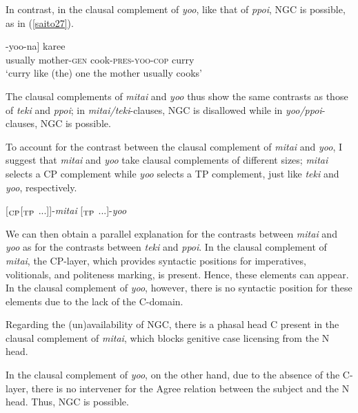\documentclass[output=paper]{langscibook}
\begin{document}
In contrast, in the clausal complement of \emph{yoo}, like that of \emph{ppoi}, NGC is possible, as in (\ref{saito27}).

\begin{exe}
\ex \label{saito27}
\gll [[{hudan} {okaasan-no} {tuku-ru}]-{yoo-na}] {karee}\\
usually mother-\textsc{gen} cook-\textsc{pres-yoo-cop} curry\\ 
\glt ‘curry like (the) one the mother usually cooks’
\end{exe}

The clausal complements of \emph{mitai} and \emph{yoo} thus show the same contrasts as those of \emph{teki} and \emph{ppoi}; in \emph{mitai/teki}-clauses, NGC is disallowed while in \emph{yoo/ppoi}-clauses, NGC is possible.

To account for the contrast between the clausal complement of \emph{mitai} and \emph{yoo}, I suggest that \emph{mitai} and \emph{yoo} take clausal complements of different sizes; \emph{mitai} selects a CP complement while \emph{yoo} selects a TP complement, just like \emph{teki} and \emph{yoo}, respectively.

\begin{exe}
\ex \label{saito28}
\begin{xlist}
\ex \label{saito28a}
[$_{\textnormal{CP}}$[$_{\textnormal{TP}}$ ...]]-\emph{mitai}
\ex \label{saito28b} [$_{\textnormal{TP}}$ ...]-\emph{yoo}
\end{xlist}
\end{exe}

We can then obtain a parallel explanation for the contrasts between \emph{mitai} and \emph{yoo} as for the contrasts between \emph{teki} and \emph{ppoi}. In the clausal complement of \emph{mitai}, the CP-layer, which provides syntactic positions for imperatives, volitionals, and politeness marking, is present. Hence, these elements can appear. In the clausal complement of \emph{yoo}, however, there is no syntactic position for these elements due to the lack of the C-domain.

Regarding the (un)availability of NGC, there is a phasal head C present in the clausal complement of \emph{mitai}, which blocks genitive case licensing from the N head.

\begin{exe}
\ex \label{saito29}
\end{exe}
In the clausal complement of \emph{yoo}, on the other hand, due to the absence of the C-layer, there is no intervener for the Agree relation between the subject and the N head. Thus, NGC is possible.
\end{document}
